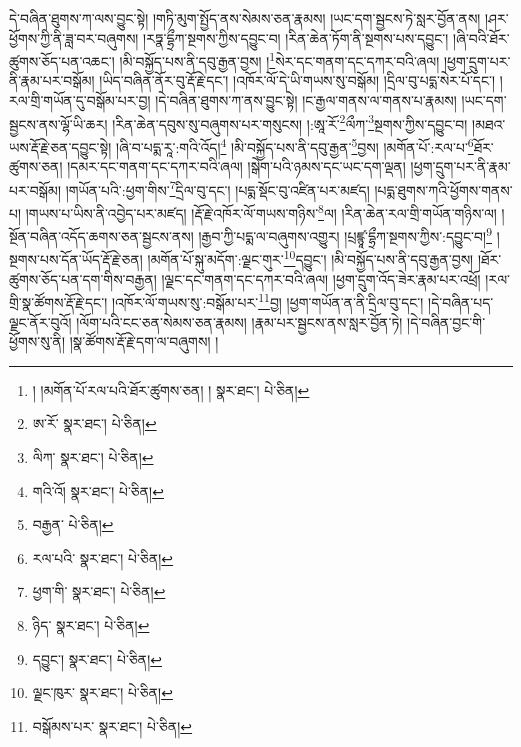 དེ་བཞིན་ཐུགས་ཀ་ལས་བྱུང་སྟེ། །གཏི་མུག་སྤྱོད་ནས་སེམས་ཅན་རྣམས། །ཡང་དག་སྦྱངས་ཏེ་སླར་བྱོན་ནས། །ཤར་ཕྱོགས་ཀྱི་ནི་ཟླ་བར་བཞུགས། །རཏྣ་དྷྲྀཀ་སྔགས་ཀྱིས་དབྱུང་བ། །རིན་ཆེན་ཏོག་ནི་སྔགས་པས་དབྱུང་། །ཞི་བའི་ཐོར་ཚུགས་ཅོད་པན་འཆང་། །མི་བསྐྱོད་པས་ནི་དབུ་རྒྱན་བྱས། །\footnote{། །མགོན་པོ་རལ་པའི་ཐོར་ཚུགས་ཅན། །  སྣར་ཐང་།  པེ་ཅིན། }སེར་དང་གནག་དང་དཀར་བའི་ཞལ། །ཕྱག་དྲུག་པར་ནི་རྣམ་པར་བསྒོམ། །ཡིད་བཞིན་ནོར་བུ་རྡོ་རྗེ་དང་། །འཁོར་ལོ་དེ་ཡི་གཡས་སུ་བསྒོམ། །དྲིལ་བུ་པདྨ་སེར་པོ་དང་། །རལ་གྲི་གཡོན་དུ་བསྒོམ་པར་བྱ། །དེ་བཞིན་ཐུགས་ཀ་ནས་བྱུང་སྟེ། །ང་རྒྱལ་གནས་ལ་གནས་པ་རྣམས། །ཡང་དག་སྦྱངས་ནས་ལྷོ་ཡི་ཆར། །རིན་ཆེན་དབུས་སུ་བཞུགས་པར་གསུངས། །:ཨཱ་རོ་\footnote{ཨ་རོ་  སྣར་ཐང་།  པེ་ཅིན། }ལྀཀ་\footnote{ལིཀ་  སྣར་ཐང་།  པེ་ཅིན། }སྔགས་ཀྱིས་དབྱུང་བ། །མཐའ་ཡས་རྡོ་རྗེ་ཅན་དབྱུང་སྟེ། །ཞི་བ་པདྨ་རཱ་:གའི་འོད།\footnote{གའི་འོ།  སྣར་ཐང་།  པེ་ཅིན། } །མི་བསྐྱོད་པས་ནི་དབུ་རྒྱན་\footnote{བརྒྱན་  པེ་ཅིན། }བྱས། །མགོན་པོ་:རལ་པ་\footnote{རལ་པའི་  སྣར་ཐང་།  པེ་ཅིན། }ཐོར་ཚུགས་ཅན། །དམར་དང་གནག་དང་དཀར་བའི་ཞལ། །སྒེག་པའི་ཉམས་དང་ཡང་དག་ལྡན། །ཕྱག་དྲུག་པར་ནི་རྣམ་པར་བསྒོམ། །གཡོན་པའི་:ཕྱག་གིས་\footnote{ཕྱག་གི་  སྣར་ཐང་།  པེ་ཅིན། }དྲིལ་བུ་དང་། །པདྨ་སྡོང་བུ་འཛིན་པར་མཛད། །པདྨ་ཐུགས་ཀའི་ཕྱོགས་གནས་པ། །གཡས་པ་ཡིས་ནི་འབྱེད་པར་མཛད། །རྡོ་རྗེ་འཁོར་ལོ་གཡས་གཉིས་\footnote{ཉིད་  སྣར་ཐང་།  པེ་ཅིན། }ལ། །རིན་ཆེན་རལ་གྲི་གཡོན་གཉིས་ལ། །སྔོན་བཞིན་འདོད་ཆགས་ཅན་སྦྱངས་ནས། །རྒྱབ་ཀྱི་པདྨ་ལ་བཞུགས་འགྱུར། །པྲཛྙཱ་དྷྲྀཀ་སྔགས་ཀྱིས་:དབྱུང་བ།\footnote{དབྱུང་།  སྣར་ཐང་།  པེ་ཅིན། } །སྔགས་པས་དོན་ཡོད་རྡོ་རྗེ་ཅན། །མགོན་པོ་སྐུ་མདོག་:ལྗང་གུར་\footnote{ལྗང་ཁུར་  སྣར་ཐང་།  པེ་ཅིན། }དབྱུང་། །མི་བསྐྱོད་པས་ནི་དབུ་རྒྱན་བྱས། །ཐོར་ཚུགས་ཅོད་པན་དག་གིས་བརྒྱན། །ལྗང་དང་གནག་དང་དཀར་བའི་ཞལ། །ཕྱག་དྲུག་འོད་ཟེར་རྣམ་པར་འཕྲོ། །རལ་གྲི་སྣ་ཚོགས་རྡོ་རྗེ་དང་། །འཁོར་ལོ་གཡས་སུ་:བསྒོམ་པར་\footnote{བསྒོམས་པར་  སྣར་ཐང་།  པེ་ཅིན། }བྱ། །ཕྱག་གཡོན་ན་ནི་དྲིལ་བུ་དང་། །དེ་བཞིན་པད་ལྗང་ནོར་བུའོ། །ལོག་པའི་ངང་ཅན་སེམས་ཅན་རྣམས། །རྣམ་པར་སྦྱངས་ནས་སླར་བྱོན་ཏེ། །དེ་བཞིན་བྱང་གི་ཕྱོགས་སུ་ནི། །སྣ་ཚོགས་རྡོ་རྗེ་དག་ལ་བཞུགས། །
